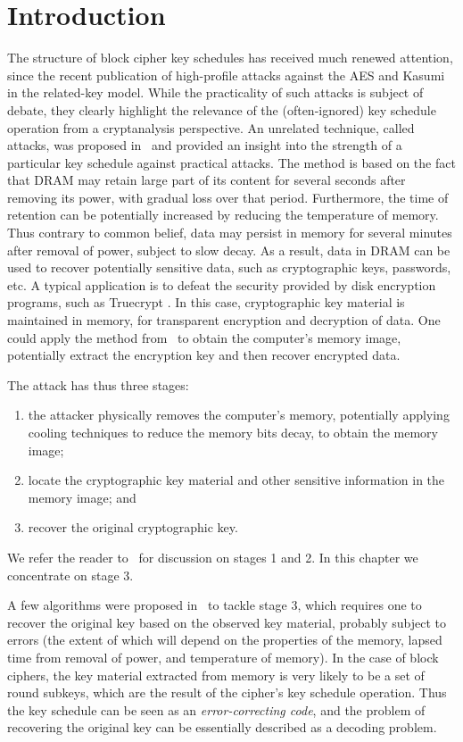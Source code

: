 \section{Introduction}
The structure of block cipher key schedules has received much renewed attention, since the recent publication of high-profile attacks against the AES \cite{aes-rka} and Kasumi \cite{kasumi-rka} in the related-key model. 
While the practicality of such attacks is subject of debate, they clearly highlight the relevance of the (often-ignored) key schedule operation from a cryptanalysis perspective. 
An unrelated technique, called \coldboot attacks, was proposed in~\cite{coldboot08} and provided an insight into the strength of a particular key schedule against practical attacks. 
The method is based on the fact that DRAM may retain large part of its content for several seconds after removing its power, with gradual loss over that period. Furthermore, the time of retention can be potentially increased by reducing the temperature of memory. Thus contrary to common belief, data may persist in memory for several minutes after removal of power, subject to slow decay. As a result, data in DRAM can be used to recover potentially sensitive data, such as cryptographic keys, passwords, etc.  A typical application is to defeat the security provided by disk encryption programs, such as Truecrypt \cite{truecrypt}. In this case, cryptographic key material is maintained in memory, for transparent encryption and decryption of data. One could apply the method from~\cite{coldboot08} to obtain the computer's memory image, potentially extract the encryption key and then recover encrypted data.

The \coldboot attack has thus three stages: 
\begin{enumerate}
\item the attacker physically removes the computer's memory, potentially applying cooling techniques to reduce the memory bits decay,
to obtain the memory image;
\item locate the cryptographic key material and other sensitive information in the memory image; and
\item recover the original cryptographic key. 
\end{enumerate}
We refer the reader to~\cite{coldboot08,cryptoeprint:2008:510} for discussion on stages 1 and 2. In this chapter we concentrate on stage 3.

A few algorithms were proposed in~\cite{coldboot08} to tackle stage 3, which requires one to recover the original key based on the observed key material, probably subject to errors (the extent of which will depend on the properties of the memory, lapsed time from removal of power, and temperature of memory). In the case of block ciphers, the key material extracted from memory is very likely to be a set of round subkeys, which are the result of the cipher's key schedule operation. Thus the key schedule can be seen as an \emph{error-correcting code}, and the problem of recovering the original key can be essentially described as a decoding problem.

